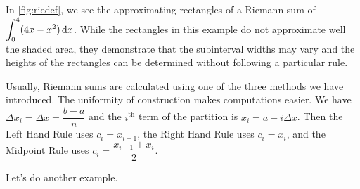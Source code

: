 In \autoref{fig:riedef}, we see the approximating rectangles of a Riemann sum of $\displaystyle\int_0^4(4x-x^2)\operatorname{d}\! x$. While the rectangles in this example do not approximate well the shaded area, they demonstrate that the subinterval widths may vary and the heights of the rectangles can be determined without following a particular rule.

Usually, Riemann sums are calculated using one of the three methods we have introduced. The uniformity of construction makes computations easier. We have $\Delta x_i = \Delta x = \dfrac{b-a}n$ and the $i^{\text{th}}$ term of the partition is $x_i = a + i\Delta x$.  Then the Left Hand Rule uses $c_i=x_{i-1}$, the Right Hand Rule uses $c_i=x_i$, and the Midpoint Rule uses $c_i=\dfrac{x_{i-1}+x_i}{2}$.


%

Let's do another example.

